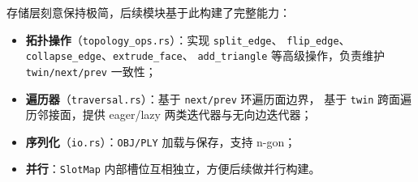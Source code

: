 \documentclass[11pt,a4paper]{article}
\begin{document}
存储层刻意保持极简，后续模块基于此构建了完整能力：
\begin{itemize}
  \item \textbf{拓扑操作}（\texttt{topology\_ops.rs}）：实现 \texttt{split\_edge}、
        \texttt{flip\_edge}、\texttt{collapse\_edge}、\texttt{extrude\_face}、
        \texttt{add\_triangle} 等高级操作，负责维护 \texttt{twin/next/prev} 一致性；
  \item \textbf{遍历器}（\texttt{traversal.rs}）：基于 \texttt{next/prev} 环遍历面边界，
        基于 \texttt{twin} 跨面遍历邻接面，提供 eager/lazy 两类迭代器与无向边迭代器；
  \item \textbf{序列化}（\texttt{io.rs}）：\texttt{OBJ/PLY} 加载与保存，支持 n-gon；
  \item \textbf{并行}：\texttt{SlotMap} 内部槽位互相独立，方便后续做并行构建。
\end{itemize}
\end{document}
